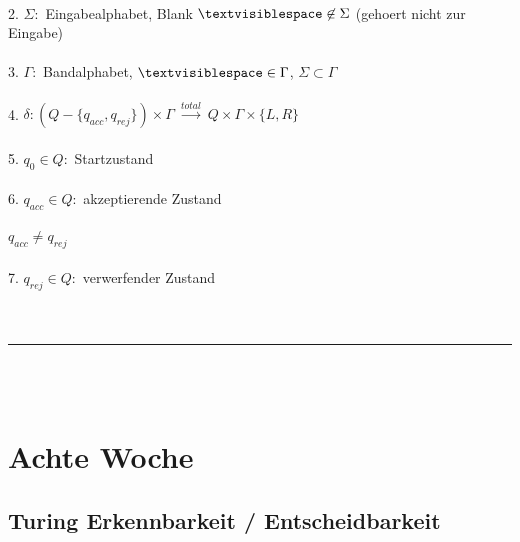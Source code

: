 \documentclass[18pt,a4paper]{scrreprt}
\newcommand{\tab}{\hspace*{2em}}
\begin{document}
\\
2. $\Sigma:$ Eingabealphabet, Blank $\textvisiblespace \not \in \Sigma$ (gehoert nicht zur Eingabe)\\
\\
3. $\Gamma:$ Bandalphabet, $\textvisiblespace \in \Gamma$, $\Sigma \subset \Gamma$\\
\\
4. $\delta: (Q-\{q_{acc}, q_{rej}\}) \times \Gamma \:\xrightarrow{total}\: Q \times \Gamma \times \{L, R\}$\\
\\
5. $q_0 \in Q:$ Startzustand\\
\\
6. $q_{acc} \in Q:$ akzeptierende Zustand\\
\\
\tab\tab $q_{acc} \neq q_{rej}$\\
\\
7. $q_{rej} \in Q:$ verwerfender Zustand\\
\\
\\
\rule{\textwidth}{0.4mm}\\
\\

\chapter{Achte Woche}
\section{Turing Erkennbarkeit / Entscheidbarkeit}
\end{document}
